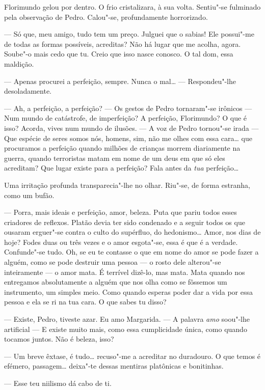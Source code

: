 Florimundo gelou por dentro. O frio cristalizara, à sua volta. Sentiu"-se
fulminado pela observação de Pedro. Calou"-se, profundamente horrorizado.

--- Só que, meu amigo, tudo tem um preço. Julguei que o sabias! Ele
possui"-me de todas as formas possíveis, acreditas? Não há lugar que me
acolha, agora. Soube"-o mais cedo que tu. Creio que isso nasce conosco.
O tal dom, essa maldição.

--- Apenas procurei a perfeição, sempre. Nunca o mal\ldots{} --- Respondeu"-lhe
desoladamente.

--- Ah, a perfeição, a perfeição? --- Os gestos de Pedro tornaram"-se
irônicos --- Num mundo de catástrofe, de imperfeição? A perfeição,
Florimundo? O que é isso? Acorda, vives num mundo de ilusões. --- A voz de
Pedro tornou"-se irada --- Que espécie de seres somos nós, homens, sim, não
me olhes com essa cara\ldots{} que procuramos a perfeição quando milhões de
crianças morrem diariamente na guerra, quando terroristas matam em nome
de um deus em que só eles acreditam? Que lugar existe para a perfeição?
Fala antes da \emph{tua} perfeição\ldots{}

Uma irritação profunda transparecia"-lhe no olhar. Riu"-se, de forma
estranha, como um bufão.

--- Porra, mais ideais e perfeição, amor, beleza. Puta que pariu todos
esses criadores de reflexos. Platão devia ter sido condenado e a seguir
todos os que ousaram erguer"-se contra o culto do supérfluo, do
hedonismo\ldots{} Amor, nos dias de hoje? Fodes duas ou três vezes e o amor
esgota"-se, essa é que é a verdade. Confunde"-se tudo. Oh, se eu te
contasse o que em nome do amor se pode fazer a alguém, como se pode
destruir uma pessoa --- o rosto dele alterou"-se inteiramente --- o amor
mata. É terrível dizê-lo, mas mata. Mata quando nos entregamos
absolutamente a alguém que nos olha como se fôssemos um instrumento, um
simples meio. Como quando esperas poder dar a vida por essa pessoa e ela
se ri na tua cara. O que sabes tu disso?

--- Existe, Pedro, tiveste azar. Eu amo Margarida. ---  A palavra \emph{amo}
soou"-lhe artificial --- E existe muito mais, como essa cumplicidade única,
como quando tocamos juntos. Não é beleza, isso?

--- Um breve êxtase, é tudo\ldots{} recuso"-me a acreditar no duradouro. O que
temos é efémero, passagem\ldots{} deixa"-te dessas mentiras platônicas e
bonitinhas.

--- Esse teu niilismo dá cabo de ti.

